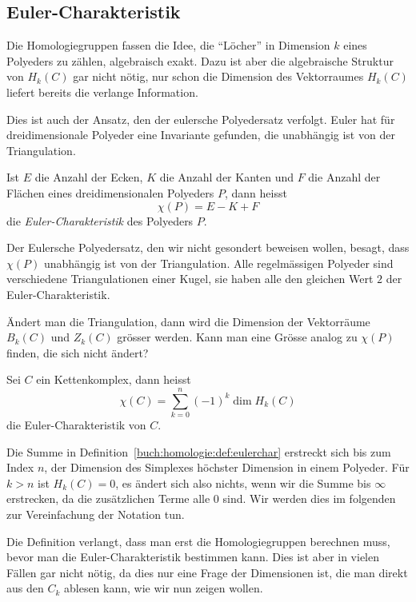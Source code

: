 \subsection{Euler-Charakteristik}
Die Homologiegruppen fassen die Idee, die ``Löcher'' in 
Dimension $k$ eines Polyeders zu zählen, algebraisch exakt.
Dazu ist aber die algebraische Struktur von $H_k(C)$  gar 
nicht nötig, nur schon die Dimension des Vektorraumes $H_k(C)$
liefert bereits die verlange Information.

Dies ist auch der Ansatz, den der eulersche Polyedersatz verfolgt.
Euler hat für dreidimensionale Polyeder eine Invariante gefunden, 
die unabhängig ist von der Triangulation.

\begin{definition}
\label{buch:homologie:def:eulerchar0}
Ist $E$ die Anzahl der Ecken, $K$ die Anzahl der Kanten und $F$
die Anzahl der Flächen eines dreidimensionalen Polyeders $P$, dann
heisst
\[
\chi(P) = E-K+F
\]
die {\em Euler-Charakteristik} des Polyeders $P$.
\end{definition}

Der Eulersche Polyedersatz, den wir nicht gesondert beweisen
wollen, besagt, dass $\chi(P)$ unabhängig ist von der 
Triangulation.
Alle regelmässigen Polyeder sind verschiedene Triangulationen
einer Kugel, sie haben alle den gleichen Wert $2$
der Euler-Charakteristik.

Ändert man die Triangulation, dann wird die Dimension der
Vektorräume $B_k(C)$ und $Z_k(C)$ grösser werden.
Kann man eine Grösse analog zu $\chi(P)$ finden, die sich nicht ändert?

\begin{definition}
\label{buch:homologie:def:eulerchar}
Sei $C$ ein Kettenkomplex, dann heisst
\[
\chi(C) = \sum_{k=0}^n (-1)^k\dim H_k(C)
\]
die Euler-Charakteristik von $C$.
\end{definition}

Die Summe in Definition~\ref{buch:homologie:def:eulerchar} erstreckt
sich bis zum Index $n$, der Dimension des Simplexes höchster Dimension
in einem Polyeder.
Für $k>n$ ist $H_k(C)=0$, es ändert sich also nichts, wenn wir
die Summe bis $\infty$ erstrecken, da die zusätzlichen Terme alle
$0$ sind.
Wir werden dies im folgenden zur Vereinfachung der Notation tun.

Die Definition verlangt, dass man erst die Homologiegruppen
berechnen muss, bevor man die Euler-Charakteristik bestimmen
kann.
Dies ist aber in vielen Fällen gar nicht nötig, da dies nur
eine Frage der Dimensionen ist, die man direkt aus den
$C_k$ ablesen kann, wie wir nun zeigen wollen.


